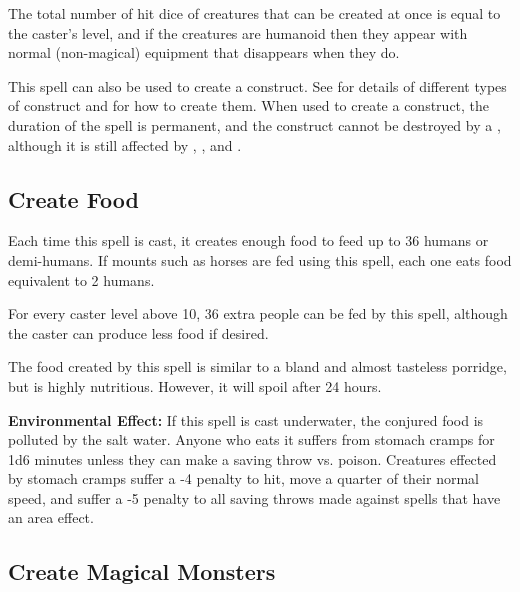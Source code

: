 \begin{multicols*}{2}
The total number of hit dice of creatures that can be created at once is equal to the caster’s level, and if the creatures are humanoid then they appear with normal (non-magical) equipment that disappears when they do.

This spell can also be used to create a construct. See  for details of different types of construct and  for how to create them. When used to create a construct, the duration of the spell is permanent, and the construct cannot be destroyed by a , although it is still affected by , , and .

\subsection{Create Food}\label{spell:Create Food}

Each time this spell is cast, it creates enough food to feed up to 36 humans or demi-humans. If mounts such as horses are fed using this spell, each one eats food equivalent to 2 humans.

For every caster level above 10, 36 extra people can be fed by this spell, although the caster can produce less food if desired.

The food created by this spell is similar to a bland and almost tasteless porridge, but is highly nutritious. However, it will spoil after 24 hours.

\textbf{Environmental Effect:} If this spell is cast underwater, the conjured food is polluted by the salt water. Anyone who eats it suffers from stomach cramps for 1d6 minutes unless they can make a saving throw vs. poison. Creatures effected by stomach cramps suffer a -4 penalty to hit, move a quarter of their normal speed, and suffer a -5 penalty to all saving throws made against spells that have an area effect.

\subsection{Create Magical Monsters}\label{spell:Create Magical Monsters}
\end{multicols*}

